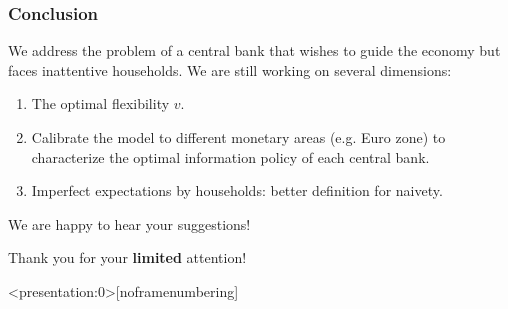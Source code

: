 \documentclass{beamer}
\begin{document}
\begin{frame}
	\frametitle{Conclusion}
    We address the problem of a central bank that wishes to guide the economy but faces inattentive households.
    \vskip10pt
    We are still working on several dimensions:
    \begin{enumerate}
        \item The optimal flexibility $v$.
        \item Calibrate the model to different monetary areas (e.g. Euro zone) to characterize the optimal information policy of each central bank.
        \item Imperfect expectations by households: better definition for naivety.
    \end{enumerate}
    \vskip10pt
    We are happy to hear your suggestions!
\end{frame}

\begin{frame}
	\begin{huge}
		\centerline{Thank you for your \textbf{limited} attention!}
	\end{huge}
\end{frame}

\begin{frame}<presentation:0>[noframenumbering]
	
	
\end{frame}
\end{document}
